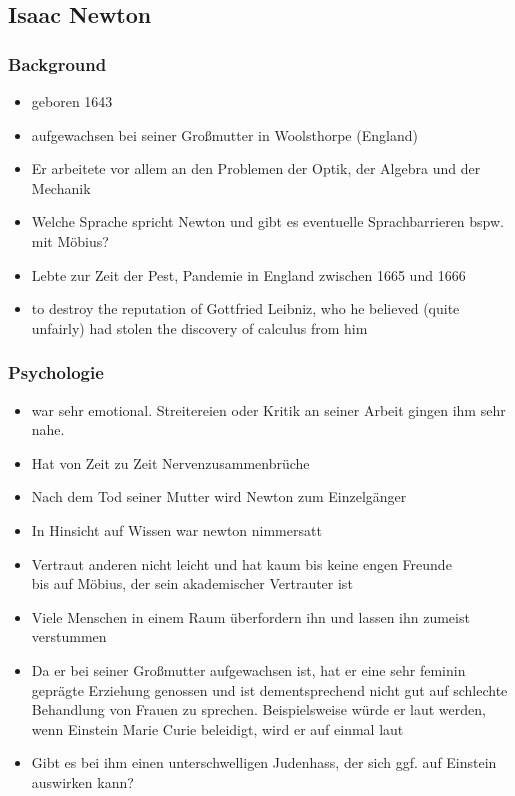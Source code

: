 \documentclass[12pt, a4paper, openany]{report}
\begin{document}
\subsection{Isaac Newton}
\subsubsection{Background}
\begin{itemize}
\item geboren 1643
\item aufgewachsen bei seiner Großmutter in Woolsthorpe (England)
\item Er arbeitete vor allem an den Problemen der Optik, der Algebra und der Mechanik
\item Welche Sprache spricht Newton und gibt es eventuelle Sprachbarrieren bspw. mit Möbius?
\item Lebte zur Zeit der Pest, Pandemie in England zwischen 1665 und 1666
\item to destroy the reputation of Gottfried Leibniz, who he believed (quite unfairly) had stolen the discovery of calculus from him 
\end{itemize}

\subsubsection{Psychologie}
\begin{itemize}
\item war sehr emotional. Streitereien oder Kritik an seiner Arbeit gingen ihm sehr nahe.
\item Hat von Zeit zu Zeit Nervenzusammenbrüche 
\item Nach dem Tod seiner Mutter wird Newton zum Einzelgänger
\item In Hinsicht auf  Wissen war newton nimmersatt
\item Vertraut anderen nicht leicht und hat kaum bis keine engen Freunde \\bis auf Möbius, der sein akademischer Vertrauter ist
\item Viele Menschen in einem Raum überfordern ihn und lassen ihn zumeist verstummen
\item Da er bei seiner Großmutter aufgewachsen ist, hat er eine sehr feminin geprägte Erziehung genossen und ist dementsprechend nicht gut auf schlechte Behandlung von Frauen zu sprechen. Beispielsweise würde er laut werden, wenn Einstein Marie Curie beleidigt, wird er auf einmal laut
\item Gibt es bei ihm einen unterschwelligen Judenhass, der sich ggf. auf Einstein auswirken kann?
\end{itemize}
\end{document}
